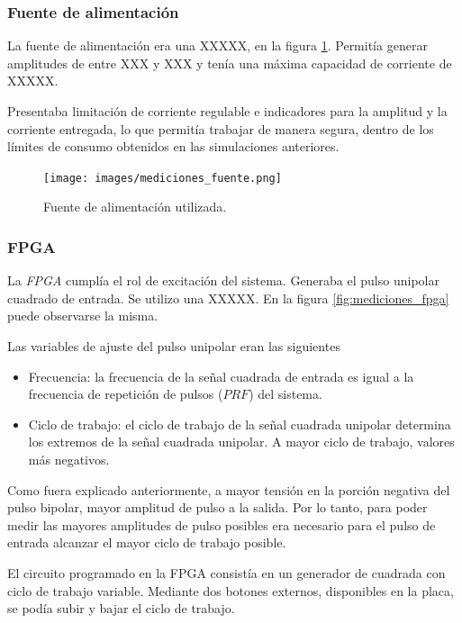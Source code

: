 \subsubsection{Fuente de alimentación}

La fuente de alimentación era una XXXXX, en la figura \ref{fig:mediciones_fuente}. Permitía generar amplitudes de entre
XXX y XXX y tenía una máxima capacidad de corriente de XXXXX.

Presentaba limitación de corriente regulable e indicadores para la amplitud y la
corriente entregada, lo que permitía trabajar de manera segura, dentro de los
límites de consumo obtenidos en las simulaciones anteriores.

\begin{figure}
  \centering
    \texttt{[image: images/mediciones\_fuente.png]}
    \caption{Fuente de alimentación utilizada.}
    \label{fig:mediciones_fuente}
\end{figure}


\subsubsection{FPGA}

La \textit{FPGA} cumplía el rol de excitación del sistema. Generaba el pulso
unipolar cuadrado de entrada. Se utilizo una XXXXX. En la figura
\ref{fig:mediciones_fpga} puede observarse la misma. 

Las variables de ajuste del pulso unipolar eran las siguientes

\begin{itemize}
  \item Frecuencia: la frecuencia de la señal cuadrada de entrada es igual a la
    frecuencia de repetición de pulsos ($PRF$) del sistema. 
  \item Ciclo de trabajo: el ciclo de trabajo de la señal cuadrada unipolar
    determina los extremos de la señal cuadrada unipolar. A mayor ciclo de
    trabajo, valores más negativos.
\end{itemize}

Como fuera explicado anteriormente, a mayor tensión en la porción negativa del
pulso bipolar, mayor amplitud de pulso a la salida. Por lo tanto, para poder
medir las mayores amplitudes de pulso posibles era necesario para el pulso de
entrada alcanzar el mayor ciclo de trabajo posible.

El circuito programado en la FPGA consistía en un generador de cuadrada con
ciclo de trabajo variable. Mediante dos botones externos, disponibles en la
placa, se podía subir y bajar el ciclo de trabajo.

